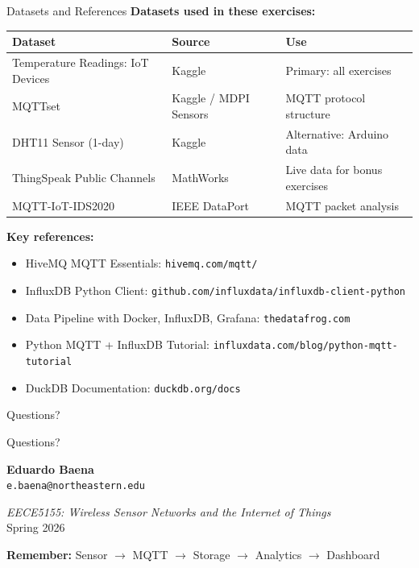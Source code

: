 \documentclass[aspectratio=169,11pt]{beamer}
\begin{document}
\begin{frame}{Datasets and References}
    \textbf{Datasets used in these exercises:}

    \vspace{0.2cm}
    \footnotesize
    \begin{center}
    \begin{tabular}{p{4cm}p{3cm}p{4cm}}
        \toprule
        \textbf{Dataset} & \textbf{Source} & \textbf{Use} \\
        \midrule
        Temperature Readings: IoT Devices & Kaggle & Primary: all exercises \\
        MQTTset & Kaggle / MDPI Sensors & MQTT protocol structure \\
        DHT11 Sensor (1-day) & Kaggle & Alternative: Arduino data \\
        ThingSpeak Public Channels & MathWorks & Live data for bonus exercises \\
        MQTT-IoT-IDS2020 & IEEE DataPort & MQTT packet analysis \\
        \bottomrule
    \end{tabular}
    \end{center}
    \normalsize

    \vspace{0.2cm}
    \textbf{Key references:}
    \begin{itemize}
        \item HiveMQ MQTT Essentials: \texttt{hivemq.com/mqtt/}
        \item InfluxDB Python Client: \texttt{github.com/influxdata/influxdb-client-python}
        \item Data Pipeline with Docker, InfluxDB, Grafana: \texttt{thedatafrog.com}
        \item Python MQTT + InfluxDB Tutorial: \texttt{influxdata.com/blog/python-mqtt-tutorial}
        \item DuckDB Documentation: \texttt{duckdb.org/docs}
    \end{itemize}
\end{frame}

\begin{frame}{Questions?}
    \begin{center}
        \Huge Questions?

        \vspace{1cm}
        \normalsize
        \textbf{Eduardo Baena}\\
        \texttt{e.baena@northeastern.edu}

        \vspace{0.5cm}
        \textit{EECE5155: Wireless Sensor Networks and the Internet of Things}\\
        Spring 2026

        \vspace{0.5cm}
        \textbf{Remember:} Sensor $\rightarrow$ MQTT $\rightarrow$ Storage $\rightarrow$ Analytics $\rightarrow$ Dashboard
    \end{center}
\end{frame}
\end{document}
